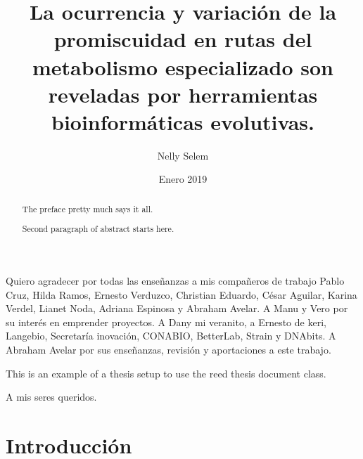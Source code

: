 \documentclass[12pt,twoside]{reedthesis}
\title{La ocurrencia y variación de la promiscuidad en rutas del metabolismo
especializado son reveladas por herramientas bioinformáticas evolutivas.}
\author{Nelly Selem}
\date{Enero 2019}
\begin{document}
      \maketitle
  
  \frontmatter %
  \pagestyle{empty} %

      \begin{acknowledgements}
      Quiero agradecer por todas las enseñanzas a mis compañeros de trabajo
      Pablo Cruz, Hilda Ramos, Ernesto Verduzco, Christian Eduardo, César
      Aguilar, Karina Verdel, Lianet Noda, Adriana Espinosa y Abraham Avelar.
      A Manu y Vero por su interés en emprender proyectos. A Dany mi veranito,
      a Ernesto de keri, Langebio, Secretaría inovación, CONABIO, BetterLab,
      Strain y DNAbits. A Abraham Avelar por sus enseñanzas, revisión y
      aportaciones a este trabajo.
    \end{acknowledgements}
  
      \begin{preface}
      This is an example of a thesis setup to use the reed thesis document
      class.
    \end{preface}
  
      \hypersetup{linkcolor=black}
    \setcounter{tocdepth}{3}
    \tableofcontents
  
      \listoftables
  
      \listoffigures
  
      \begin{abstract}
      The preface pretty much says it all. \par  Second paragraph of abstract
      starts here.
    \end{abstract}
  
      \begin{dedication}
      A mis seres queridos.
    \end{dedication}
  
  \mainmatter %
  \pagestyle{fancyplain} %

  \chapter*{Introducción}\label{introduccion}
  
\end{document}
